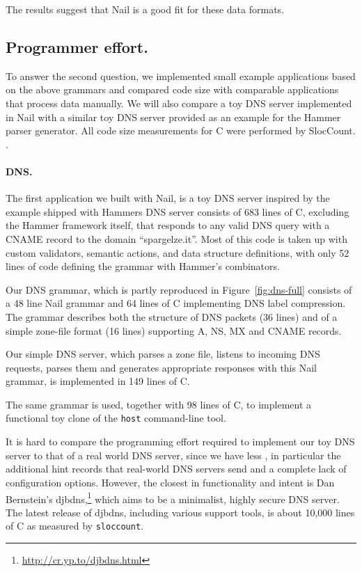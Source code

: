 The results suggest that Nail is a good fit for these data formats. 



\subsection{Programmer effort.}


\label{s:eval-effort}
To answer the second question, we implemented small example applications based on the above
grammars and compared code size with comparable applications that process data manually. We will
also compare a toy DNS server implemented in Nail with a similar toy DNS server provided as an
example for the Hammer parser generator. All code size measurements for C were performed by
SlocCount\cite{sloccount}. .


\paragraph{DNS.}

The first application we built with Nail, is a toy DNS server inspired by the example shipped with
Hammers DNS server consists of 683 lines of C, excluding the Hammer framework itself, that responds to
any valid DNS query with a CNAME record to the domain ``spargelze.it''.
Most of this code is taken up with custom validators, semantic actions,
and data structure definitions, with only 52 lines of code defining the
grammar with Hammer's combinators.

Our DNS grammar, which is partly reproduced in Figure~\ref{fig:dns-full} consists of a 48 line  Nail
grammar and 64 lines of C implementing DNS label compression. 
The grammar describes both the structure of DNS packets (36 lines) and of a simple zone-file format
(16 lines) supporting A, NS, MX and CNAME records.
  
Our simple DNS server, which parses a zone file, listens to incoming DNS requests, parses them and
generates appropriate responses with this Nail grammar, is implemented in 149 lines of C. 

 The same grammar is used, together with 98 lines of C,
to implement a functional toy clone of the \texttt{host} command-line
tool. 

It is hard to compare the programming effort required to implement
our toy DNS server to that of a real world DNS server, since
we have less , in particular the additional hint records that real-world DNS servers send and a
complete lack of configuration options.
However, the closest in functionality and intent is Dan Bernstein's
djbdns,\footnote{\url{http://cr.yp.to/djbdns.html}} which aims to be
a minimalist, highly secure DNS server. The latest release of djbdns,
including various support tools, is about 10,000 lines of C as measured by
\texttt{sloccount}. 

